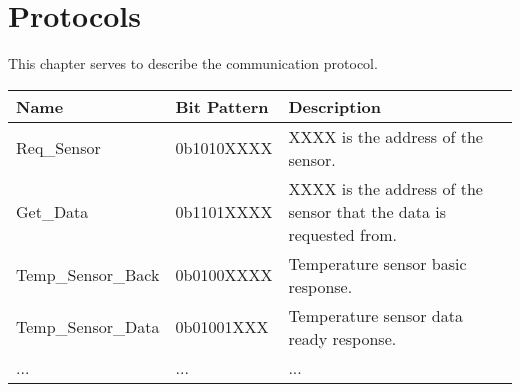 \chapter{Protocols}
This chapter serves to describe the communication protocol.


\begin{table}[H]
    \begin{tabular}{|l|l|p{10cm}|}
    \hline
    Name & Bit Pattern & Description \\
    \hline
    Req\_Sensor & 0b1010XXXX & XXXX is the address of the sensor.\\ 
	\hline
    Get\_Data & 0b1101XXXX & XXXX is the address of the sensor that the data is requested from.\\
    \hline
    Temp\_Sensor\_Back & 0b0100XXXX & Temperature sensor basic response. \\
    \hline
    Temp\_Sensor\_Data & 0b01001XXX & Temperature sensor data ready response. \\
    \hline
    ... & ... & ... \\
    \hline
    \end{tabular}
\end{table}